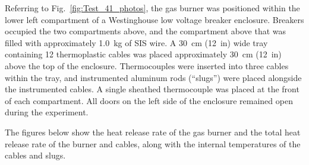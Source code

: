 Referring to Fig.~\ref{fig:Test_41_photos}, the gas burner was positioned within the lower left compartment of a Westinghouse low voltage breaker enclosure. Breakers occupied the two compartments above, and the compartment above that was filled with approximately 1.0~kg of SIS wire. A 30~cm (12~in) wide tray containing 12 thermoplastic cables was placed approximately 30~cm (12~in) above the top of the enclosure. Thermocouples were inserted into three cables within the tray, and instrumented aluminum rods (``slugs'') were placed alongside the instrumented cables. A single sheathed thermocouple was placed at the front of each compartment. All doors on the left side of the enclosure remained open during the experiment.

The figures below show the heat release rate of the gas burner and the total heat release rate of the burner and cables, along with the internal temperatures of the cables and slugs.

